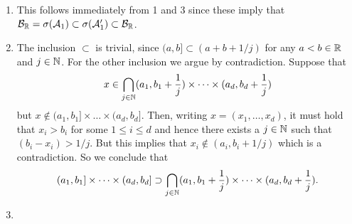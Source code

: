 \begin{enumerate}[label=(\alph*)]
From 2 it follows that $O$ is a union over a subset collection of interval $(a_1,b_1) \times \dots \times (a_d, b_d)$ where $a_i,b_i \in \bbQ$. Since $\bbQ$ is countable and $d$ finite, the collection $\{(a_1,b_1) \times \dots \times (a_d, b_d) \, : \, a_i < b_i \in \bbQ\}$ is also countable and hence $O = \bigcup_{I \in \cA, I \subset O} I \in \sigma(\cA)$, from which it follows that $\cB_\bbR \subset \sigma(\cA)$.
\item {}

This follows immediately from 1 and 3 since these imply that $\mathcal B_{\mathbb R} = \sigma(\mathcal A_1) \subset \sigma(\mathcal A_1^\prime) \subset \mathcal B_{\mathbb R}$.
\item {} 

The inclusion $\subset$ is trivial, since $(a,b] \subset (a + b +1/j)$ for any $a < b \in \mathbb R$ and $j \in \mathbb N$. For the other inclusion we argue by contradiction. Suppose that 
\[
	x \in \bigcap_{j \in \mathbb N} (a_1, b_1+\frac{1}{j}) \times \dots \times (a_d, b_d+\frac{1}{j})
\] 
but $x \notin (a_1,b_1] \times \dots \times (a_d, b_d]$. Then, writing $x = (x_1, \dots, x_d)$, it must hold that $x_i > b_i$ for some $1 \le i \le d$ and hence there exists a $j \in \mathbb N$ such that $(b_i-x_i) > 1/j$. But this implies that $x_i \notin (a_i,b_i+1/j)$ which is a contradiction. So we conclude that 
\[
	(a_1,b_1] \times \dots \times (a_d, b_d] \supset \bigcap_{j \in \mathbb N} (a_1, b_1+\frac{1}{j}) \times \dots \times (a_d, b_d+\frac{1}{j}).
\]
\item {}
\end{enumerate}
